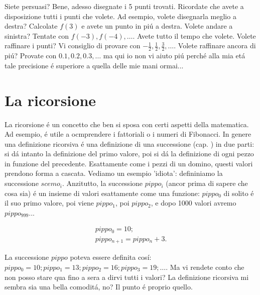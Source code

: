 Siete persuasi? Bene, adesso disegnate i 5 punti trovati. Ricordate che avete a disposizione tutti i punti che volete.
Ad esempio, volete disegnarla meglio a destra? Calcolate $f(3)$ e avete un punto in pi\'u a destra. Volete andare a sinistra?
Tentate con $f(-3),f(-4),\ldots$. Avete tutto il tempo che volete. Volete raffinare i punti? Vi consiglio di provare con
$-\frac{1}{2},\frac{1}{2},\frac{3}{2},\ldots$. Volete raffinare ancora di pi\'u? Provate con $0.1,0.2,0.3,\ldots$ ma qui
io non vi aiuto pi\'u perch\'e alla mia et\'a tale precisione \'e superiore a quella delle mie mani ormai...

\label{ricorsione} \section{La ricorsione}

La ricorsione \'e un concetto che ben si sposa con certi aspetti della matematica. Ad esempio,
\'e utile a ocmprendere i fattoriali o i numeri di Fibonacci. In genere una definizione ricorsiva
\'e una definizione di una successione (cap. ) in due parti: si d\'a intanto
la definizione del primo valore, poi si d\'a la definizione di ogni pezzo in funzione del precedente.
Esattamente come i pezzi di un domino, questi valori prendono forma a cascata. Vediamo un esempio 'idiota':
defininiamo la successione $scemo_i$. Anzitutto, la successione $pippo_i$ (ancor prima di sapere che cosa sia)
\'e un insieme di valori esattamente come una funzione: $pippo_0$ di solito \'e il suo primo valore, poi viene
$pippo_1$, poi $pippo_2$, e dopo 1000 valori avremo $pippo_{999}$...

\begin{eqnarray}
pippo_0=10;\\
pippo_{n+1}=pippo_n+3.
\end{eqnarray}

La successione $pippo$ poteva essere definita cos\'i: $pippo_0=10;pippo_1=13;pippo_2=16;pippo_3=19;\ldots$. Ma vi rendete conto che non posso stare qua fino a sera a dirvi tutti i valori? La definizione ricorsiva mi sembra sia una bella comodit\'a, no? Il punto \'e proprio quello.














